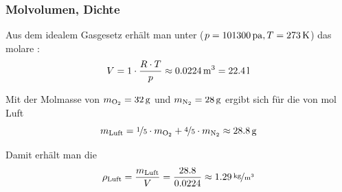 \begin{frame}
  \frametitle{Molvolumen, Dichte}
  Aus dem idealem Gasgesetz erh\"alt man unter 
  ($p=\unit[101300]{pa}, T=\unit[273]{K}$) das molare :
  \[
    V = 1\cdot \frac{R\cdot T}{p} \approx \unit[0.0224]{m^3}= \unit[22.4]{l}%
  \]

  Mit der Molmasse von $m_{\mathrm{O}_2} = \unit[32]{g}$ und $m_{\mathrm{N}_2} = \unit[28]{g}$
  ergibt sich f\"ur die  von \unit[1]{mol} Luft
  \[
    m_\mathrm{Luft} = \nicefrac{1}{5} \cdot m_{\mathrm{O}_2}
                      + \nicefrac{4}{5} \cdot m_{\mathrm{N}_2}
                    \approx \unit[28.8]{g}
  \]
  
  Damit erh\"alt man die 
  \[
    \rho_\mathrm{Luft} = \frac{m_\mathrm{Luft}}{V} = \frac{28.8}{0.0224}\approx \unitfrac[1.29]{kg}{m^3}
  \]

  \ifteacher%
  \else%
    \vspace*{-0.10\baselineskip}\rotatebox[origin=lB]{180}{%
    \resizebox{0.9\linewidth}{!}{\parbox[t]{3.95\linewidth}{%
    Normbedingungen, Volumen, Masse, Dichte
    }}}
  \fi%



\end{frame}


